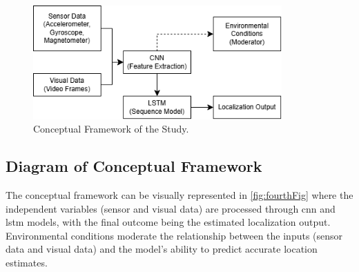 \begin{refsection}
\begin{figure}[H]
    \centering
	\includegraphics[width=0.85\textwidth]{figures/framework.png} 
	\caption[Conceptural Framework]{Conceptual Framework of the Study.}
	\label{fig:forthFig}
\end{figure}

\subsection{Diagram of Conceptual Framework}

The conceptual framework can be visually represented in \ref{fig:fourthFig} where the independent variables (sensor and visual data) are processed through \gls{cnn} and \gls{lstm} models, with the final outcome being the estimated localization output. Environmental conditions moderate the relationship between the inputs (sensor data and visual data) and the model's ability to predict accurate location estimates.

\clearpage

\printbibliography[heading=subbibintoc, title={\centering Notes}]
\end{refsection}